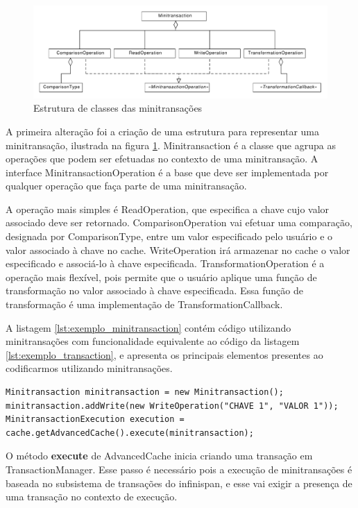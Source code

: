 \documentclass[11pt,twoside,a4paper]{book}
\begin{document}
\begin{figure}
  \centering
  \includegraphics[width=\textwidth]{transaction_operations} 
  \caption{Estrutura de classes das minitransações}
  \label{fig:transaction_operations} 
\end{figure}

A primeira alteração foi a criação de uma estrutura para representar uma minitransação, ilustrada na figura \ref{fig:transaction_operations}. Minitransaction é a classe que agrupa as operações que podem ser efetuadas no contexto de uma minitransação. A interface MinitransactionOperation é a base que deve ser implementada por qualquer operação que faça parte de uma minitransação.

A operação mais simples é ReadOperation, que especifica a chave cujo valor associado deve ser retornado. ComparisonOperation vai efetuar uma comparação, designada por ComparisonType, entre um valor especificado pelo usuário e o valor associado à chave no cache. WriteOperation irá armazenar no cache o valor especificado e associá-lo à chave especificada. TransformationOperation é a operação mais flexível, pois permite que o usuário aplique uma função de transformação no valor associado à chave especificada. Essa função de transformação é uma implementação de TransformationCallback.

A listagem \ref{lst:exemplo_minitransaction} contém código utilizando minitransações com funcionalidade equivalente ao código da listagem \ref{lst:exemplo_transaction}, e apresenta os principais elementos presentes ao codificarmos utilizando minitransações.

\begin{lstlisting}[caption={Minitransação}, label=lst:exemplo_minitransaction]
Minitransaction minitransaction = new Minitransaction();
minitransaction.addWrite(new WriteOperation("CHAVE 1", "VALOR 1"));
MinitransactionExecution execution = cache.getAdvancedCache().execute(minitransaction);
\end{lstlisting}

O método \textbf{execute} de AdvancedCache inicia criando uma transação em TransactionManager. Esse passo é necessário pois a execução de minitransações é baseada no subsistema de transações do infinispan, e esse vai exigir a presença de uma transação no contexto de execução.
\end{document}
